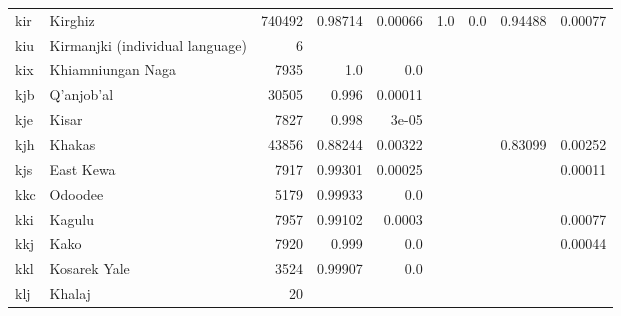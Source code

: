 \documentclass[11pt]{article}
\begin{document}
\begin{table*}[h]
{\begin{tabular}{llrrrrrrr}
kir         & Kirghiz         & 740492         & 0.98714         & 0.00066         & 1.0         & 0.0         & 0.94488         & 0.00077         \\

kiu         & Kirmanjki (individual language)         & 6         &          &          &          &          &          &          \\

kix         & Khiamniungan Naga         & 7935         & 1.0         & 0.0         &          &          &          &          \\

kjb         & Q'anjob'al         & 30505         & 0.996         & 0.00011         &          &          &          &          \\

kje         & Kisar         & 7827         & 0.998         & 3e-05         &          &          &          &          \\

kjh         & Khakas         & 43856         & 0.88244         & 0.00322         &          &          & 0.83099         & 0.00252         \\

kjs         & East Kewa         & 7917         & 0.99301         & 0.00025         &          &          &          & 0.00011         \\

kkc         & Odoodee         & 5179         & 0.99933         & 0.0         &          &          &          &          \\

kki         & Kagulu         & 7957         & 0.99102         & 0.0003         &          &          &          & 0.00077         \\

kkj         & Kako         & 7920         & 0.999         & 0.0         &          &          &          & 0.00044         \\

kkl         & Kosarek Yale         & 3524         & 0.99907         & 0.0         &          &          &          &          \\

klj         & Khalaj         & 20         &          &          &          &          &          &          \\


\end{tabular}}
\end{table*}
\end{document}
